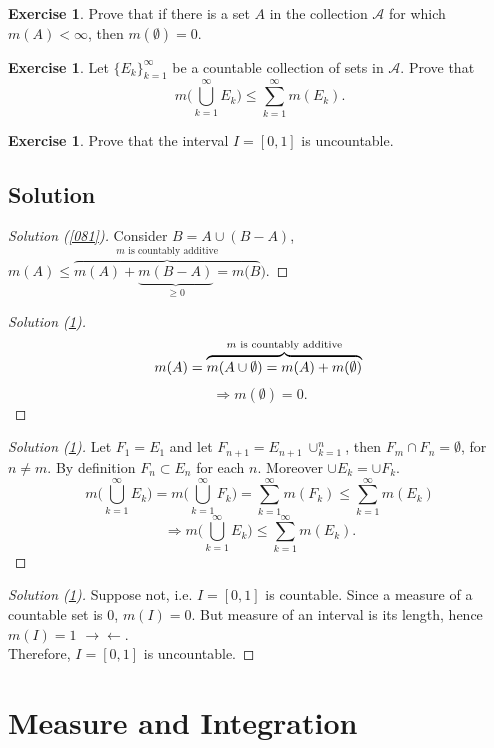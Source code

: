 \documentclass[	DIV=calc,paper=a4,fontsize=11pt]{scrartcl}	 	%
\theoremstyle{definition}
\newtheorem{exer}[thm]{Exercise}
\theoremstyle{plain}
\theoremstyle{remark}
\begin{document}
\begin{exer}\label{082}
Prove that if there is a set $A$ in the collection $\mathcal{A}$ for which $m(A)< \infty$, then $m(\emptyset)=0$.
\end{exer}

\begin{exer}\label{083}
Let $\{E_k\}_{k=1}^{\infty}$ be a countable collection of sets in $\mathcal{A}$. Prove that
\[m\biggl(\bigcup_{k=1}^{\infty}E_k\biggl)\le \sum_{k=1}^{\infty}m(E_k).\]
\end{exer}

\begin{exer}\label{084}
Prove that the interval $I=[0,1]$ is uncountable.
\end{exer}

\newpage
\subsection*{Solution}
\begin{proof}[Solution (\ref{081})]
Consider $B=A\cup (B-A)$, $m(A)\le \overbrace{m(A)+\underbrace{m(B-A)}_{\ge0}=m(B}^{m\text{ is countably additive}})$.
\end{proof}
\begin{proof}[Solution (\ref{082})]
\[
m(A)=\overbrace{m(A\cup \emptyset)=m(A)+m(\emptyset)}^{m\text{ is countably additive}}\\
\]
\[\Rightarrow m(\emptyset)=0.\]
\end{proof}
\begin{proof}[Solution (\ref{083})]
Let $F_1=E_1$ and let $F_{n+1}=E_{n+1}\ \cup_{k=1}^{n}$, then $F_{m}\cap F_n=\emptyset$, for $n\neq m$. By definition $F_n\subset E_n$ for each $n$. Moreover $\cup E_k=\cup F_k$.
\[m\biggl(\bigcup_{k=1}^{\infty} E_k\biggl)=m\biggl(\bigcup_{k=1}^{\infty} F_k\biggl)=\sum_{k=1}^{\infty}m(F_k)\leq \sum_{k=1}^{\infty}m(E_k)\]
\[\Rightarrow m\biggl(\bigcup_{k=1}^{\infty}E_k\biggl)\le \sum_{k=1}^{\infty}m(E_k).\]
\end{proof}

\begin{proof}[Solution (\ref{084})]
Suppose not, i.e. $I=[0,1]$ is countable. Since a measure of a countable set is $0$, $m(I)=0$. But measure of an interval is its length, hence $m(I)=1$ $\rightarrow\leftarrow$.\\
Therefore, $I=[0,1]$ is uncountable.
\end{proof}

\newpage
\section{Measure and Integration}
\end{document}
